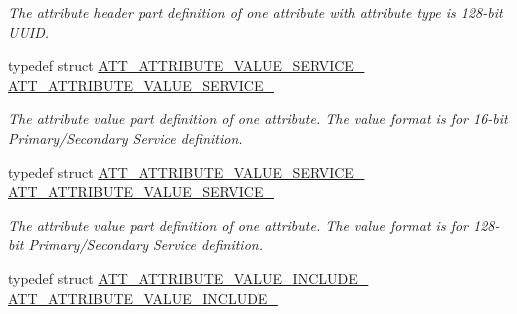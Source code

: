\begin{DoxyCompactItemize}
\begin{DoxyCompactList}\small\item\em The attribute header part definition of one attribute with attribute type is 128-\/bit U\+U\+ID. \end{DoxyCompactList}\item 
typedef struct \hyperlink{struct_a_t_t___a_t_t_r_i_b_u_t_e___v_a_l_u_e___s_e_r_v_i_c_e__2}{A\+T\+T\+\_\+\+A\+T\+T\+R\+I\+B\+U\+T\+E\+\_\+\+V\+A\+L\+U\+E\+\_\+\+S\+E\+R\+V\+I\+C\+E\+\_} \hyperlink{group___b_l_e___g_a_t_t___s_e_r_v_i_c_e___t_a_b_l_e_ga35dd16fdfb99d5e2a98883c8df09a0ba}{A\+T\+T\+\_\+\+A\+T\+T\+R\+I\+B\+U\+T\+E\+\_\+\+V\+A\+L\+U\+E\+\_\+\+S\+E\+R\+V\+I\+C\+E\+\_}\hypertarget{group___b_l_e___g_a_t_t___s_e_r_v_i_c_e___t_a_b_l_e_ga35dd16fdfb99d5e2a98883c8df09a0ba}{}\label{group___b_l_e___g_a_t_t___s_e_r_v_i_c_e___t_a_b_l_e_ga35dd16fdfb99d5e2a98883c8df09a0ba}

\begin{DoxyCompactList}\small\item\em The attribute value part definition of one attribute. The value format is for 16-\/bit Primary/\+Secondary Service definition. \end{DoxyCompactList}\item 
typedef struct \hyperlink{struct_a_t_t___a_t_t_r_i_b_u_t_e___v_a_l_u_e___s_e_r_v_i_c_e__16}{A\+T\+T\+\_\+\+A\+T\+T\+R\+I\+B\+U\+T\+E\+\_\+\+V\+A\+L\+U\+E\+\_\+\+S\+E\+R\+V\+I\+C\+E\+\_} \hyperlink{group___b_l_e___g_a_t_t___s_e_r_v_i_c_e___t_a_b_l_e_ga2d68755953d70efe5864baeca8d87354}{A\+T\+T\+\_\+\+A\+T\+T\+R\+I\+B\+U\+T\+E\+\_\+\+V\+A\+L\+U\+E\+\_\+\+S\+E\+R\+V\+I\+C\+E\+\_}\hypertarget{group___b_l_e___g_a_t_t___s_e_r_v_i_c_e___t_a_b_l_e_ga2d68755953d70efe5864baeca8d87354}{}\label{group___b_l_e___g_a_t_t___s_e_r_v_i_c_e___t_a_b_l_e_ga2d68755953d70efe5864baeca8d87354}

\begin{DoxyCompactList}\small\item\em The attribute value part definition of one attribute. The value format is for 128-\/bit Primary/\+Secondary Service definition. \end{DoxyCompactList}\item 
typedef struct \hyperlink{struct_a_t_t___a_t_t_r_i_b_u_t_e___v_a_l_u_e___i_n_c_l_u_d_e__2}{A\+T\+T\+\_\+\+A\+T\+T\+R\+I\+B\+U\+T\+E\+\_\+\+V\+A\+L\+U\+E\+\_\+\+I\+N\+C\+L\+U\+D\+E\+\_} \hyperlink{group___b_l_e___g_a_t_t___s_e_r_v_i_c_e___t_a_b_l_e_gad780bd835de0ddbc343ce0ca9ad2e7a7}{A\+T\+T\+\_\+\+A\+T\+T\+R\+I\+B\+U\+T\+E\+\_\+\+V\+A\+L\+U\+E\+\_\+\+I\+N\+C\+L\+U\+D\+E\+\_}\hypertarget{group___b_l_e___g_a_t_t___s_e_r_v_i_c_e___t_a_b_l_e_gad780bd835de0ddbc343ce0ca9ad2e7a7}{}\label{group___b_l_e___g_a_t_t___s_e_r_v_i_c_e___t_a_b_l_e_gad780bd835de0ddbc343ce0ca9ad2e7a7}


\end{DoxyCompactItemize}
